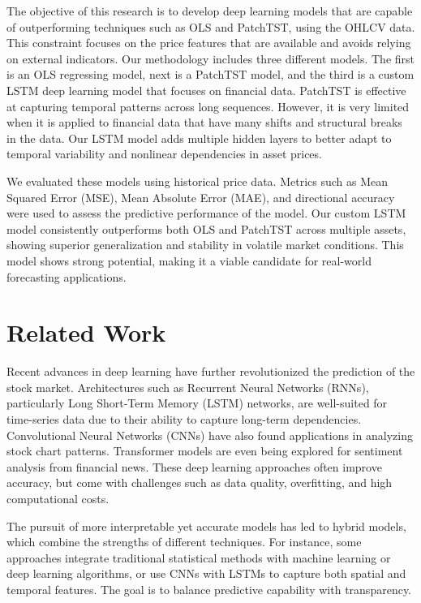 \documentclass[conference]{IEEEtran}
\begin{document}
The objective of this research is to develop deep learning models that are capable of outperforming techniques such as OLS and PatchTST, using the OHLCV data. This constraint focuses on the price features that are available and avoids relying on external indicators. Our methodology includes three different models. The first is an OLS regressing model, next is a PatchTST model, and the third is a custom LSTM deep learning model that focuses on financial data. PatchTST is effective at capturing temporal patterns across long sequences. However, it is very limited when it is applied to financial data that have many shifts and structural breaks in the data. Our LSTM model adds multiple hidden layers to better adapt to temporal variability and nonlinear dependencies in asset prices. 

We evaluated these models using historical price data. Metrics such as Mean Squared Error (MSE), Mean Absolute Error (MAE), and directional accuracy were used to assess the predictive performance of the model. Our custom LSTM model consistently outperforms both OLS and PatchTST across multiple assets, showing superior generalization and stability in volatile market conditions. This model shows strong potential, making it a viable candidate for real-world forecasting applications. 

\section{Related Work}

Recent advances in deep learning have further revolutionized the prediction of the stock market. Architectures such as Recurrent Neural Networks (RNNs), particularly Long Short-Term Memory (LSTM) networks, are well-suited for time-series data due to their ability to capture long-term dependencies. Convolutional Neural Networks (CNNs) have also found applications in analyzing stock chart patterns. Transformer models are even being explored for sentiment analysis from financial news. These deep learning approaches often improve accuracy, but come with challenges such as data quality, overfitting, and high computational costs.

The pursuit of more interpretable yet accurate models has led to hybrid models, which combine the strengths of different techniques. For instance, some approaches integrate traditional statistical methods with machine learning or deep learning algorithms, or use CNNs with LSTMs to capture both spatial and temporal features. The goal is to balance predictive capability with transparency.
\end{document}

